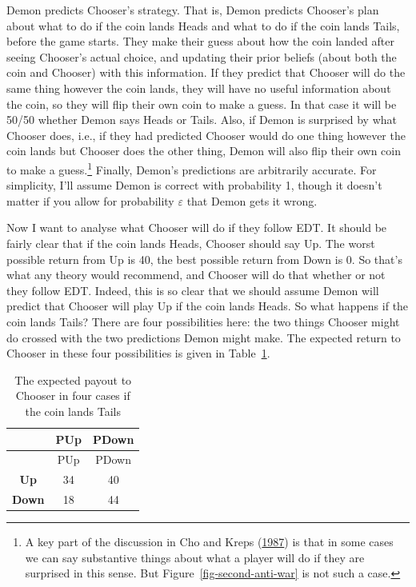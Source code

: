 \documentclass[
  12pt,
  letterpaper,
  DIV=11,
  numbers=noendperiod]{scrreprt}
\begin{document}
Demon predicts Chooser's strategy. That is, Demon predicts Chooser's
plan about what to do if the coin lands Heads and what to do if the coin
lands Tails, before the game starts. They make their guess about how the
coin landed after seeing Chooser's actual choice, and updating their
prior beliefs (about both the coin and Chooser) with this information.
If they predict that Chooser will do the same thing however the coin
lands, they will have no useful information about the coin, so they will
flip their own coin to make a guess. In that case it will be 50/50
whether Demon says Heads or Tails. Also, if Demon is surprised by what
Chooser does, i.e., if they had predicted Chooser would do one thing
however the coin lands but Chooser does the other thing, Demon will also
flip their own coin to make a guess.\footnote{A key part of the
  discussion in Cho and Kreps
  (\protect\hyperlink{ref-ChoKreps1987}{1987}) is that in some cases we
  can say substantive things about what a player will do if they are
  surprised in this sense. But Figure~\ref{fig-second-anti-war} is not
  such a case.} Finally, Demon's predictions are arbitrarily accurate.
For simplicity, I'll assume Demon is correct with probability 1, though
it doesn't matter if you allow for probability \(\varepsilon\) that
Demon gets it wrong.

Now I want to analyse what Chooser will do if they follow EDT. It should
be fairly clear that if the coin lands Heads, Chooser should say Up. The
worst possible return from Up is 40, the best possible return from Down
is 0. So that's what any theory would recommend, and Chooser will do
that whether or not they follow EDT. Indeed, this is so clear that we
should assume Demon will predict that Chooser will play Up if the coin
lands Heads. So what happens if the coin lands Tails? There are four
possibilities here: the two things Chooser might do crossed with the two
predictions Demon might make. The expected return to Chooser in these
four possibilities is given in Table~\ref{tbl-payout-if-tails}.

\hypertarget{tbl-payout-if-tails}{}
\begin{longtable}[]{@{}ccc@{}}
\caption{\label{tbl-payout-if-tails}The expected payout to Chooser in
four cases if the coin lands Tails}\tabularnewline
\toprule\noalign{}
& PUp & PDown \\
\midrule\noalign{}
\endfirsthead
\toprule\noalign{}
& PUp & PDown \\
\midrule\noalign{}
\endhead
\bottomrule\noalign{}
\endlastfoot
\textbf{Up} & 34 & 40 \\
\textbf{Down} & 18 & 44 \\
\end{longtable}
\end{document}
